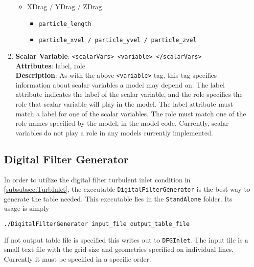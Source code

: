 \begin{enumerate}
\begin{itemize}
\item XDrag / YDrag / ZDrag
	\begin{itemize}
	\item \verb=particle_length=
	\item \verb=particle_xvel / particle_yvel / particle_zvel=
	\end{itemize}

\end{itemize}

\item {\bf Scalar Variable}: \verb=<scalarVars> <variable> </scalarVars>= \\
{\bf Attributes}: label, role \\
{\bf Description}: As with the above \verb=<variable>= tag, this tag specifies information about scalar variables a model may depend on. The label attribute indicates the label of the scalar variable, and the role specifies the role that scalar variable will play in the model. The label attribute must match a label for one of the scalar variables. The role must match one of the role names specified by the model, in the model code.  Currently, scalar variables do not play a role in any models currently implemented.

\end{enumerate}


\subsection{Digital Filter Generator}
In order to utilize the digital filter turbulent inlet condition  in \ref{subsubsec:TurbInlet}, the executable \verb=DigitalFilterGenerator= is the best way to generate the table needed.  This executable lies in the \verb=StandAlone= folder.  Its usage is simply 

\begin{verbatim}
./DigitalFilterGenerator input_file output_table_file
\end{verbatim}

If not output table file is specified this writes out to \verb=DFGInlet=.  The input file is a small text file with the grid size and geometries specified on individual lines.  Currently it must be specified in a specific order.

